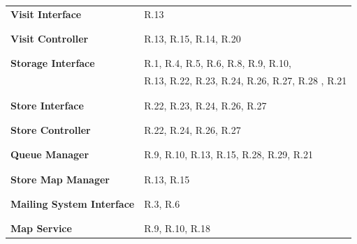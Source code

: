 \documentclass[a4paper, 12pt, oneside, table]{article}
\newcommand*{\lorenzo}[1]{\textcolor{BurntOrange}{#1}}
\begin{document}
\begin{tabularx}{\linewidth}{| g || l |}
	\large{\textbf{Visit Interface}} &  R.13\\
    & \\
	\hline
	\rule{0pt}{15pt}& \\
	\large{\textbf{Visit Controller}} &  R.13, R.15\lorenzo{, R.14, R.20}\\
    & \\
	\hline
	\rule{0pt}{15pt}& \\
	\large{\textbf{Storage Interface}} &  R.1, R.4, R.5, R.6, R.8, R.9, R.10, \\
	&  R.13, R.22, R.23, R.24, R.26, R.27, R.28 \lorenzo{, R.21}\\
    & \\
	\hline
	\rule{0pt}{15pt}& \\
	\large{\textbf{Store Interface}} &  R.22, R.23, R.24, R.26, R.27\\
    & \\
	\hline
	\rule{0pt}{15pt}& \\
	\large{\textbf{Store Controller}} &  R.22, R.24, R.26, R.27\\
    & \\
	\hline
	\rule{0pt}{15pt}& \\
	\large{\textbf{Queue Manager}} &  R.9, R.10, R.13, R.15, R.28, R.29\lorenzo{, R.21}\\
    & \\
	\hline
	\rule{0pt}{15pt}& \\
	\large{\textbf{Store Map Manager}} &  R.13, R.15\\
    & \\
	\hline
	\rule{0pt}{15pt}& \\
	\large{\textbf{Mailing System Interface}} &  R.3, R.6\\
    & \\
	\hline
	\rule{0pt}{15pt}& \\
	\large{\textbf{Map Service}} &  R.9, R.10, R.18\\

\end{tabularx}
\end{document}
